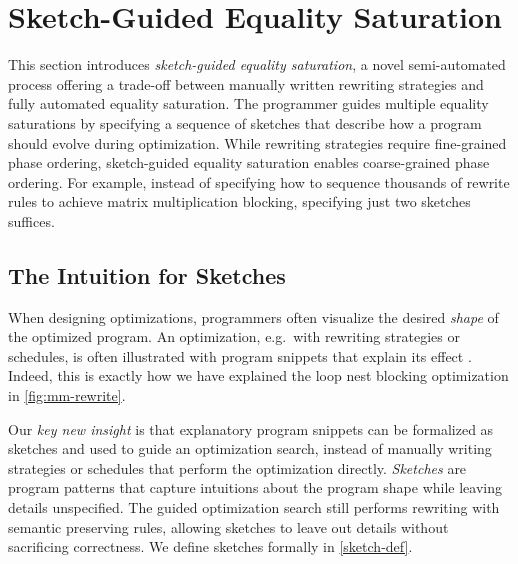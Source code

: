 \section{Sketch-Guided Equality Saturation} %
\label{sketching}

This section introduces \emph{sketch-guided equality saturation}, a novel semi-automated process offering a trade-off between manually written rewriting strategies and fully automated equality saturation.
The programmer guides multiple equality saturations by specifying a sequence of sketches that describe how a program should evolve during optimization.
While rewriting strategies require fine-grained phase ordering, sketch-guided equality saturation enables coarse-grained phase ordering.
For example, instead of specifying how to sequence thousands of rewrite rules to achieve matrix multiplication blocking, specifying just two sketches suffices.

\subsection{The Intuition for Sketches}

When designing optimizations, programmers often visualize the desired \emph{shape} of the optimized program. An optimization, e.g.~with rewriting strategies or schedules, is often illustrated with program snippets that explain its effect \cite{koehler2021-elevate-imgproc, ragan2013-halide, chen2018-tvm, adams2019-learning, sioutas2020-schedule, ikarashi2021-guided, anderson2021-efficient}. Indeed, this is exactly how we have explained the loop nest blocking optimization in \cref{fig:mm-rewrite}.

Our \emph{key new insight} is that explanatory program snippets can be formalized as sketches and used to guide an optimization search, instead of manually writing strategies or schedules that perform the optimization directly.
\emph{Sketches} are program patterns that capture intuitions about the program shape while leaving details unspecified.
The guided optimization search still performs rewriting with semantic preserving rules, allowing sketches to leave out details without sacrificing correctness.
We define sketches formally in \cref{sketch-def}.

